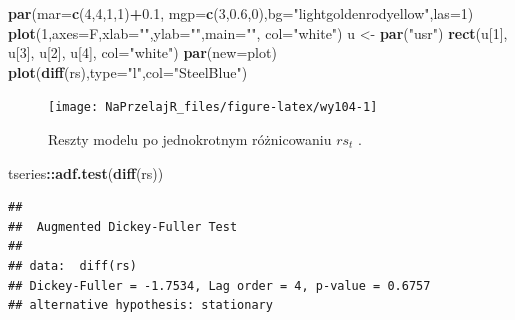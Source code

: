 \documentclass[polish,]{book}
\newenvironment{Shaded}{\begin{snugshade}}{\end{snugshade}}
\newcommand{\DataTypeTok}[1]{\textcolor[rgb]{0.13,0.29,0.53}{#1}}
\newcommand{\DecValTok}[1]{\textcolor[rgb]{0.00,0.00,0.81}{#1}}
\newcommand{\FloatTok}[1]{\textcolor[rgb]{0.00,0.00,0.81}{#1}}
\newcommand{\KeywordTok}[1]{\textcolor[rgb]{0.13,0.29,0.53}{\textbf{#1}}}
\newcommand{\NormalTok}[1]{#1}
\newcommand{\OperatorTok}[1]{\textcolor[rgb]{0.81,0.36,0.00}{\textbf{#1}}}
\newcommand{\StringTok}[1]{\textcolor[rgb]{0.31,0.60,0.02}{#1}}
\begin{document}
\begin{Shaded}
\begin{Highlighting}[]
\KeywordTok{par}\NormalTok{(}\DataTypeTok{mar=}\KeywordTok{c}\NormalTok{(}\DecValTok{4}\NormalTok{,}\DecValTok{4}\NormalTok{,}\DecValTok{1}\NormalTok{,}\DecValTok{1}\NormalTok{)}\OperatorTok{+}\FloatTok{0.1}\NormalTok{, }\DataTypeTok{mgp=}\KeywordTok{c}\NormalTok{(}\DecValTok{3}\NormalTok{,}\FloatTok{0.6}\NormalTok{,}\DecValTok{0}\NormalTok{),}\DataTypeTok{bg=}\StringTok{"lightgoldenrodyellow"}\NormalTok{,}\DataTypeTok{las=}\DecValTok{1}\NormalTok{)}
\KeywordTok{plot}\NormalTok{(}\DecValTok{1}\NormalTok{,}\DataTypeTok{axes=}\NormalTok{F,}\DataTypeTok{xlab=}\StringTok{""}\NormalTok{,}\DataTypeTok{ylab=}\StringTok{""}\NormalTok{,}\DataTypeTok{main=}\StringTok{""}\NormalTok{, }\DataTypeTok{col=}\StringTok{"white"}\NormalTok{)}
\NormalTok{u <-}\StringTok{ }\KeywordTok{par}\NormalTok{(}\StringTok{"usr"}\NormalTok{)}
\KeywordTok{rect}\NormalTok{(u[}\DecValTok{1}\NormalTok{], u[}\DecValTok{3}\NormalTok{], u[}\DecValTok{2}\NormalTok{], u[}\DecValTok{4}\NormalTok{], }\DataTypeTok{col=}\StringTok{"white"}\NormalTok{)}
\KeywordTok{par}\NormalTok{(}\DataTypeTok{new=}\NormalTok{plot)}
\KeywordTok{plot}\NormalTok{(}\KeywordTok{diff}\NormalTok{(rs),}\DataTypeTok{type=}\StringTok{"l"}\NormalTok{,}\DataTypeTok{col=}\StringTok{"SteelBlue"}\NormalTok{)}
\end{Highlighting}
\end{Shaded}

\begin{figure}[h]

{\centering \texttt{[image: NaPrzelajR\_files/figure-latex/wy104-1]} 

}

\caption{Reszty modelu po jednokrotnym różnicowaniu $rs_t$ .}\label{fig:wy104}
\end{figure}

\begin{Shaded}
\begin{Highlighting}[]
\NormalTok{tseries}\OperatorTok{::}\KeywordTok{adf.test}\NormalTok{(}\KeywordTok{diff}\NormalTok{(rs))}
\end{Highlighting}
\end{Shaded}

\begin{verbatim}
## 
##  Augmented Dickey-Fuller Test
## 
## data:  diff(rs)
## Dickey-Fuller = -1.7534, Lag order = 4, p-value = 0.6757
## alternative hypothesis: stationary
\end{verbatim}
\end{document}

